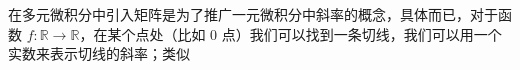 

在多元微积分中引入矩阵是为了推广一元微积分中斜率的概念，具体而已，对于函数 $f: \mathbb{R} \to \mathbb{R}$，在某个点处（比如 $0$ 点）我们可以找到一条切线，我们可以用一个实数来表示切线的斜率；类似